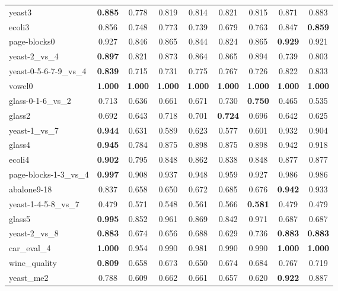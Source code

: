 \begin{table}[!htbp]
{\begin{tabular}{lcccccccc}
			yeast3 & \textbf{0.885} & 0.778 & 0.819 & 0.814 & 0.821 & 0.815 & 0.871 & 0.883 \\
			ecoli3 & 0.856 & 0.748 & 0.773 & 0.739 & 0.679 & 0.763 & 0.847 & \textbf{0.859} \\
			page-blocks0 & 0.927 & 0.846 & 0.865 & 0.844 & 0.824 & 0.865 & \textbf{0.929} & 0.921 \\
			yeast-2\_vs\_4 & \textbf{0.897} & 0.821 & 0.873 & 0.864 & 0.865 & 0.894 & 0.739 & 0.803 \\
			yeast-0-5-6-7-9\_vs\_4 & \textbf{0.839} & 0.715 & 0.731 & 0.775 & 0.767 & 0.726 & 0.822 & 0.833 \\
			vowel0 & \textbf{1.000} & \textbf{1.000} & \textbf{1.000} & \textbf{1.000} & \textbf{1.000} & \textbf{1.000} & \textbf{1.000} & \textbf{1.000} \\
			glass-0-1-6\_vs\_2 & 0.713 & 0.636 & 0.661 & 0.671 & 0.730 & \textbf{0.750} & 0.465 & 0.535 \\
			glass2 & 0.692 & 0.643 & 0.718 & 0.701 & \textbf{0.724} & 0.696 & 0.642 & 0.625 \\
			yeast-1\_vs\_7 & \textbf{0.944} & 0.631 & 0.589 & 0.623 & 0.577 & 0.601 & 0.932 & 0.904 \\
			glass4 & \textbf{0.945} & 0.784 & 0.875 & 0.898 & 0.875 & 0.898 & 0.942 & 0.918 \\
			ecoli4 & \textbf{0.902} & 0.795 & 0.848 & 0.862 & 0.838 & 0.848 & 0.877 & 0.877 \\
			page-blocks-1-3\_vs\_4 & \textbf{0.997} & 0.908 & 0.937 & 0.948 & 0.959 & 0.927 & 0.986 & 0.986 \\
			abalone9-18 & 0.837 & 0.658 & 0.650 & 0.672 & 0.685 & 0.676 & \textbf{0.942} & 0.933 \\
			yeast-1-4-5-8\_vs\_7 & 0.479 & 0.571 & 0.548 & 0.561 & 0.566 & \textbf{0.581} & 0.479 & 0.479 \\
			glass5 & \textbf{0.995} & 0.852 & 0.961 & 0.869 & 0.842 & 0.971 & 0.687 & 0.687 \\
			yeast-2\_vs\_8 & \textbf{0.883} & 0.674 & 0.656 & 0.688 & 0.629 & 0.736 & \textbf{0.883} & \textbf{0.883} \\
			car\_eval\_4 & \textbf{1.000} & 0.954 & 0.990 & 0.981 & 0.990 & 0.990 & \textbf{1.000} & \textbf{1.000} \\
			wine\_quality & \textbf{0.809} & 0.658 & 0.673 & 0.650 & 0.674 & 0.684 & 0.767 & 0.719 \\
			yeast\_me2 & 0.788 & 0.609 & 0.662 & 0.661 & 0.657 & 0.620 & \textbf{0.922} & 0.887 \\

\end{tabular}}
\end{table}
